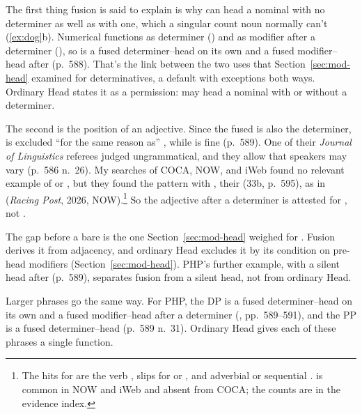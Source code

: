 The first thing fusion is said to explain is why  can head a nominal with no determiner as well as with one, which a singular count noun normally can't (\ref{ex:dog}b). Numerical  functions as determiner () and as modifier after a determiner (), so  is a fused determiner--head on its own and a fused modifier--head after  (p.~588). That's the link between the two uses that Section~\ref{sec:mod-head} examined for determinatives, a default with exceptions both ways. Ordinary Head states it as a permission:  may head a nominal with or without a determiner.

The second is the position of an adjective. Since the fused  is also the determiner,  is excluded \enquote{for the same reason as} , while  is fine (p.~589). One of their \textit{Journal of Linguistics} referees judged  ungrammatical, and they allow that speakers may vary (p.~586 n.~26). My searches of COCA, NOW, and iWeb found no relevant example of  or , but they found the pattern with , their (33b, p.~595), as in  (\textit{Racing Post}, 2026, NOW).\footnote{The hits for  are the verb , slips for  or , and adverbial or sequential .  is common in NOW and iWeb and absent from COCA; the counts are in the evidence index.} So the adjective after a determiner is attested for , not .

The gap before a bare  is the one Section~\ref{sec:mod-head} weighed for . Fusion derives it from adjacency, and ordinary Head excludes it by its condition on pre-head modifiers (Section~\ref{sec:mod-head}). PHP's further example,  with a silent head after  (p.~589), separates fusion from a silent head, not from ordinary Head.

Larger phrases go the same way. For PHP, the DP  is a fused determiner--head on its own and a fused modifier--head after a determiner (, pp.~589--591), and the PP  is a fused determiner--head (p.~589 n.~31). Ordinary Head gives each of these phrases a single function.

